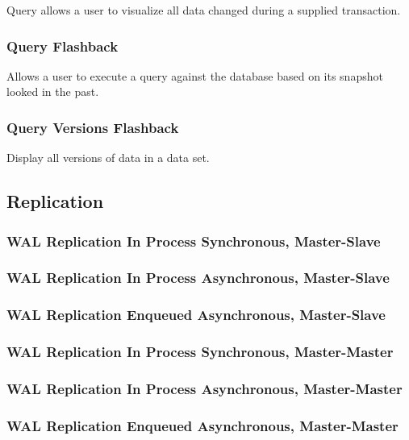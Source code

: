 Query allows a user to visualize all data changed during a supplied transaction.

\subsubsection{Query Flashback}

Allows a user to execute a query against the database based on its snapshot
looked in the past.

\subsubsection{Query Versions Flashback}

Display all versions of data in a data set.

\subsection{Replication}

\subsubsection{WAL Replication In Process Synchronous, Master-Slave}

\subsubsection{WAL Replication In Process Asynchronous, Master-Slave}

\subsubsection{WAL Replication Enqueued Asynchronous, Master-Slave}

\subsubsection{WAL Replication In Process Synchronous, Master-Master}

\subsubsection{WAL Replication In Process Asynchronous, Master-Master}

\subsubsection{WAL Replication Enqueued Asynchronous, Master-Master}


